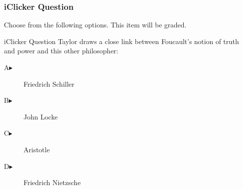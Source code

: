 \begin{frame}
  \frametitle{iClicker Question}
Choose from the following options. This item will be graded.
\begin{block}{iClicker Question}
  Taylor draws a close link between Foucault's notion of truth and
  power and this other philosopher:
\end{block}
\begin{description}
\item[A\hspace{.2in}$\blacktriangleright$] Friedrich Schiller
\item[B\hspace{.2in}$\blacktriangleright$] John Locke
\item[C\hspace{.2in}$\blacktriangleright$] Aristotle
\item[D\hspace{.2in}$\blacktriangleright$] Friedrich Nietzsche
\end{description}
\end{frame}
